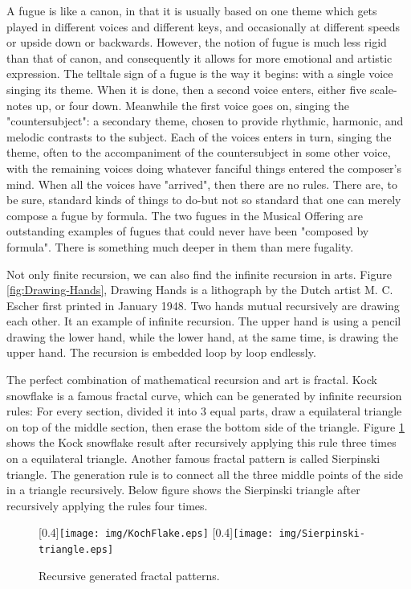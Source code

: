 \documentclass{article}
\begin{document}
A fugue is like a canon, in that it is usually based on one theme which gets played in different voices and different keys, and occasionally at different speeds or upside down or backwards. However, the notion of fugue is much less rigid than that of canon, and consequently it allows for more emotional and artistic expression. The telltale sign of a fugue is the way it begins: with a single voice singing its theme. When it is done, then a second voice enters, either five scale-notes up, or four down. Meanwhile the first voice goes on, singing the "countersubject": a secondary theme, chosen to provide rhythmic, harmonic, and melodic contrasts to the subject. Each of the voices enters in turn, singing the theme, often to the accompaniment of the countersubject in some other voice, with the remaining voices doing whatever fanciful things entered the composer's mind. When all the voices have "arrived", then there are no rules. There are, to be sure, standard kinds of things to do-but not so standard that one can merely compose a fugue by formula. The two fugues in the Musical Offering are outstanding examples of fugues that could never have been "composed by formula". There is something much deeper in them than mere fugality\cite{GEB}.

Not only finite recursion, we can also find the infinite recursion in arts. Figure \ref{fig:Drawing-Hands}, Drawing Hands is a lithograph by the Dutch artist M. C. Escher first printed in January 1948. Two hands mutual recursively are drawing each other. It an example of infinite recursion. The upper hand is using a pencil drawing the lower hand, while the lower hand, at the same time, is drawing the upper hand. The recursion is embedded loop by loop endlessly.

The perfect combination of mathematical recursion and art is fractal. Kock snowflake is a famous fractal curve, which can be generated by infinite recursion rules: For every section, divided it into 3 equal parts, draw a equilateral triangle on top of the middle section, then erase the bottom side of the triangle. Figure \ref{fig:fractal} shows the Kock snowflake result after recursively applying this rule three times on a equilateral triangle. Another famous fractal pattern is called Sierpinski triangle. The generation rule is to connect all the three middle points of the side in a triangle recursively. Below figure shows the Sierpinski triangle after recursively applying the rules four times.

\begin{figure}[htbp]
 \centering
 [0.4\linewidth]{\texttt{[image: img/KochFlake.eps]}}
 [0.4\linewidth]{\texttt{[image: img/Sierpinski-triangle.eps]}}
 \caption{Recursive generated fractal patterns.}
 \label{fig:fractal}
\end{figure}
\end{document}
